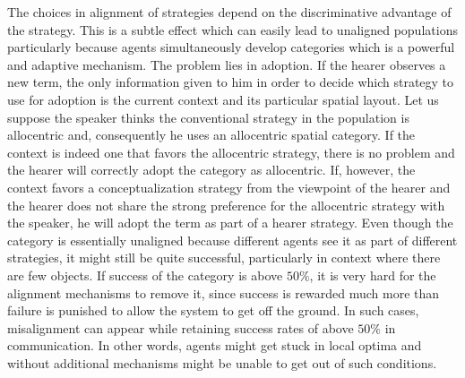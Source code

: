 The choices in alignment of strategies depend on the discriminative advantage of the strategy. 
This is a subtle effect which can easily lead to unaligned populations particularly because
agents simultaneously develop categories which is a powerful and adaptive mechanism.
The problem lies in adoption. If the hearer observes a new term,
the only information given to him in order to decide which strategy to use for adoption is the current
context and its particular spatial layout. Let us suppose the speaker thinks the conventional 
strategy in the population is allocentric and, consequently he uses an allocentric spatial
category. If the context is indeed one that favors the allocentric strategy, there is no problem and
the hearer will correctly adopt the category as allocentric. If, however, the context favors a
conceptualization strategy from the viewpoint of the hearer and the hearer does not share the 
strong preference for the allocentric strategy with the speaker, he will adopt the term as 
part of a hearer strategy. Even though the category is essentially unaligned
because different agents see it as part of different strategies, it might still be quite successful, 
particularly in context where there are few objects. 
If success of the category is above $50\si{\percent}$, it is very hard for the alignment mechanisms 
to remove it, since success is rewarded much more than failure is punished to allow 
the system to get off the ground. In such cases, misalignment can appear while retaining
success rates of above $50\si{\percent}$ in communication. In other words, agents might get stuck in 
local optima and without additional mechanisms might be unable to get out of such
conditions.


